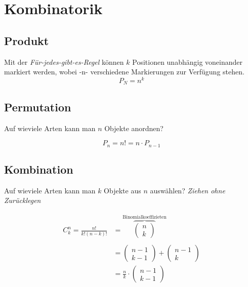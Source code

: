 \section{Kombinatorik}

\subsection{Produkt}
Mit der \textit{Für-jedes-gibt-es-Regel} können $k$ Positionen unabhängig voneinander markiert werden, wobei -n- verschiedene Markierungen zur Verfügung stehen.
\[
P_N = n^k
\]

\subsection{Permutation}
Auf wieviele Arten kann man $n$ Objekte anordnen?

\[
P_n = n! = n \cdot P_{n-1}
\]

\subsection{Kombination}
Auf wieviele Arten kann man $k$ Objekte aus $n$ auswählen? \textit{Ziehen ohne Zurücklegen}

\begin{align*}
	C_k^n = \frac{n!}{k!(n-k)!} &= \overbrace{\begin{pmatrix}	n \\ k \end{pmatrix}}^\text{Binomialkoeffizieten} \\ \\
	&=  \begin{pmatrix}	n - 1 \\ k -1\end{pmatrix} +  \begin{pmatrix}	n -1\\ k \end{pmatrix} \\
	&= \frac{n}{k} \cdot  \begin{pmatrix}	n - 1 \\ k -1\end{pmatrix}
\end{align*}


